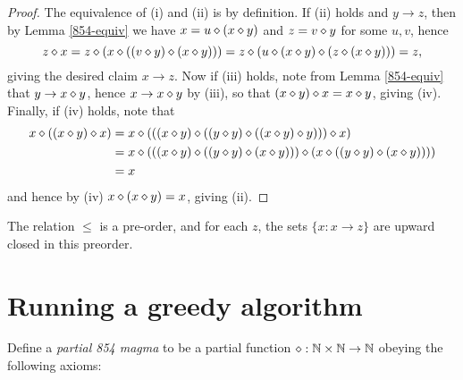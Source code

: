 \begin{proof}  The equivalence of (i) and (ii) is by definition.  If (ii) holds and $y \to z$, then by  Lemma \ref{854-equiv} we have $x = u \diamond (x \diamond y)$ and $z = v \diamond y$ for some $u,v$, hence
  $$ z \diamond x = z \diamond (x \diamond ((v \diamond y) \diamond (x \diamond y))) = z \diamond (u \diamond (x \diamond y) \diamond (z \diamond (x \diamond y))) = z,$$
giving the desired claim $x \to z$.  Now if (iii) holds, note from Lemma \ref{854-equiv} that $y \to x \diamond y$, hence $x \to x \diamond y$ by (iii), so that $(x \diamond y) \diamond x = x \diamond y$, giving (iv).  Finally, if (iv) holds, note that
\begin{align*}
  x \diamond ((x \diamond y) \diamond x) &= x \diamond ( ((x \diamond y) \diamond ((y \diamond y) \diamond ((x \diamond y) \diamond y))) \diamond x) \\
  &= x \diamond (((x \diamond y) \diamond ((y \diamond y) \diamond (x \diamond y))) \diamond (x \diamond ((y \diamond y) \diamond (x \diamond y)))) \\
  &= x
\end{align*}
and hence by (iv) $x \diamond (x \diamond y) = x$, giving (ii).
\end{proof}

\begin{corollary}  The relation $\leq$ is a pre-order, and for each $z$, the sets $\{ x: x \to z \}$ are upward closed in this preorder.
\end{corollary}



\section{Running a greedy algorithm}

Define a \emph{partial 854 magma} to be a partial function $\diamond: \mathbb{N} \times \mathbb{N} \to \mathbb{N}$ obeying the following axioms:

